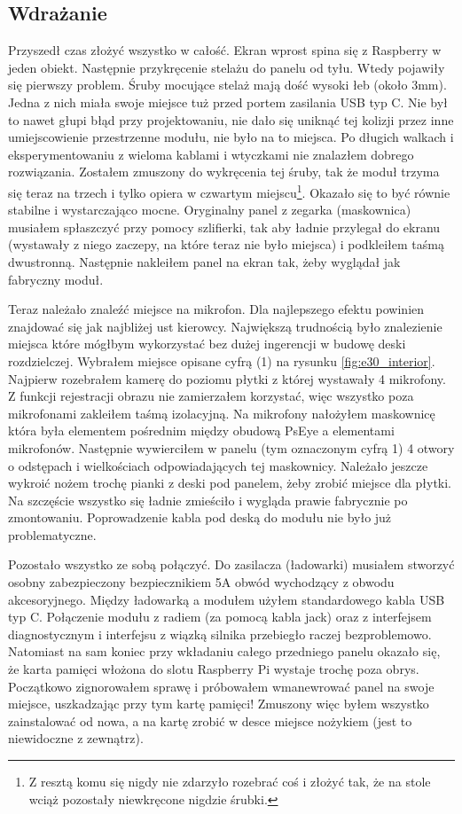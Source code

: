 \documentclass[declaration,shortabstract, inz]{iithesis}
\begin{document}
\subsection{Wdrażanie}
    Przyszedł czas złożyć wszystko w całość. Ekran wprost spina się z Raspberry w jeden obiekt. Następnie przykręcenie stelażu do panelu od tyłu. Wtedy pojawiły się pierwszy problem. Śruby mocujące stelaż mają dość wysoki łeb (około 3mm). Jedna z nich miała swoje miejsce tuż przed portem zasilania USB typ C. Nie był to nawet głupi błąd przy projektowaniu, nie dało się uniknąć tej kolizji przez inne umiejscowienie przestrzenne modułu, nie było na to miejsca. Po długich walkach i eksperymentowaniu z wieloma kablami i wtyczkami nie znalazłem dobrego rozwiązania. Zostałem zmuszony do wykręcenia tej śruby, tak że moduł trzyma się teraz na trzech i tylko opiera w czwartym miejscu\footnote{Z resztą komu się nigdy nie zdarzyło rozebrać coś i złożyć tak, że na stole wciąż pozostały niewkręcone nigdzie śrubki.}. Okazało się to być równie stabilne i wystarczająco mocne. Oryginalny panel z zegarka (maskownica) musiałem spłaszczyć przy pomocy szlifierki, tak aby ładnie przylegał do ekranu (wystawały z niego zaczepy, na które teraz nie było miejsca) i podkleiłem taśmą dwustronną. Następnie nakleiłem panel na ekran tak, żeby wyglądał jak fabryczny moduł.
    
    Teraz należało znaleźć miejsce na mikrofon. Dla najlepszego efektu powinien znajdować się jak najbliżej ust kierowcy. Największą trudnością było znalezienie miejsca które mógłbym wykorzystać bez dużej ingerencji w budowę deski rozdzielczej. Wybrałem miejsce opisane cyfrą (1) na rysunku \ref{fig:e30_interior}. Najpierw rozebrałem kamerę do poziomu płytki z której wystawały 4 mikrofony. Z funkcji rejestracji obrazu nie zamierzałem korzystać, więc wszystko poza mikrofonami zakleiłem taśmą izolacyjną. Na mikrofony nałożyłem maskownicę która była elementem pośrednim między obudową PsEye a elementami mikrofonów. Następnie wywierciłem w panelu (tym oznaczonym cyfrą 1) 4 otwory o odstępach i wielkościach odpowiadających tej maskownicy. Należało jeszcze wykroić nożem trochę pianki z deski pod panelem, żeby zrobić miejsce dla płytki. Na szczęście wszystko się ładnie zmieściło i wygląda prawie fabrycznie po zmontowaniu. Poprowadzenie kabla pod deską do modułu nie było już problematyczne.
    
    Pozostało wszystko ze sobą połączyć. Do zasilacza (ładowarki) musiałem stworzyć osobny zabezpieczony bezpiecznikiem 5A obwód wychodzący z obwodu akcesoryjnego. Między ładowarką a modułem użyłem standardowego kabla USB typ C. Połączenie modułu z radiem (za pomocą kabla jack) oraz z interfejsem diagnostycznym i interfejsu z wiązką silnika przebiegło raczej bezproblemowo. Natomiast na sam koniec przy wkładaniu całego przedniego panelu okazało się, że karta pamięci włożona do slotu Raspberry Pi wystaje trochę poza obrys. Początkowo zignorowałem sprawę i próbowałem wmanewrować panel na swoje miejsce, uszkadzając przy tym kartę pamięci! Zmuszony więc byłem wszystko zainstalować od nowa, a na kartę zrobić w desce miejsce nożykiem (jest to niewidoczne z zewnątrz).
    
\end{document}

